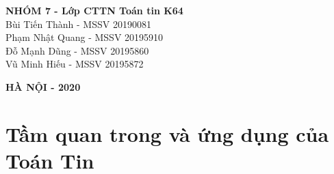 \documentclass[12pt,a4paper]{report}
\begin{document}
{        \begin{center}
            \normalsize
            \textbf{NHÓM 7 - Lớp CTTN Toán tin K64} \\
            Bùi Tiến Thành - MSSV 20190081 \\
            Phạm Nhật Quang - MSSV 20195910 \\
            Đỗ Mạnh Dũng - MSSV 20195860 \\
            Vũ Minh Hiếu - MSSV 20195872 \\
            
        \end{center}
        \vspace{0.0cm}
        \begin{center}
            \textbf{{\large HÀ NỘI - 2020}}\\
        \end{center}
    }
    \newpage
    \setcounter{page}{2}
    

    \tableofcontents
    \pagebreak
    
    
    
    \chapter{Tầm quan trong và ứng dụng của Toán Tin}
\end{document}
